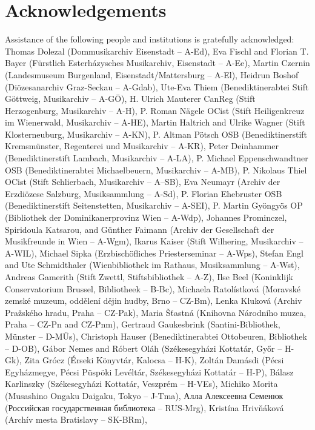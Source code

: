 \documentclass{ees}
\begin{document}
\section{Acknowledgements}

Assistance of the following people and institutions is gratefully acknowledged:
Thomas Dolezal (Dommusikarchiv Eisenstadt – A-Ed),
Eva Fischl and Florian T. Bayer (Fürstlich Esterházysches Musikarchiv, Eisenstadt – A-Ee),
Martin Czernin (Landesmuseum Burgenland, Eisenstadt/Mattersburg – A-El),
Heidrun Boshof (Diözesanarchiv Graz-Seckau – A-Gdab),
Ute-Eva Thiem (Benediktinerabtei Stift Göttweig, Musikarchiv – A-GÖ),
H. Ulrich Mauterer CanReg (Stift Herzogenburg, Musikarchiv – A-H),
P. Roman Nägele OCist (Stift Heiligenkreuz im Wienerwald, Musikarchiv – A-HE),
Martin Haltrich and Ulrike Wagner (Stift Klosterneuburg, Musikarchiv – A-KN),
P. Altman Pötsch OSB (Benediktinerstift Kremsmünster, Regenterei und Musikarchiv – A-KR),
Peter Deinhammer (Benediktinerstift Lambach, Musikarchiv – A-LA),
P. Michael Eppenschwandtner OSB (Benediktinerabtei Michaelbeuern, Musikarchiv – A-MB),
P. Nikolaus Thiel OCist (Stift Schlierbach, Musikarchiv – A–SB),
Eva Neumayr (Archiv der Erzdiözese Salzburg, Musiksammlung – A-Sd),
P. Florian Ehebruster OSB (Benediktinerstift Seitenstetten, Musikarchiv – A-SEI),
P. Martin Gyöngyös OP (Bibliothek der Dominikanerprovinz Wien – A-Wdp),
Johannes Prominczel, Spiridoula Katsarou, and Günther Faimann (Archiv der Gesellschaft der Musikfreunde in Wien – A-Wgm),
Ikarus Kaiser (Stift Wilhering, Musikarchiv – A-WIL),
Michael Sipka (Erzbischöfliches Priesterseminar – A-Wps),
Stefan Engl and Ute Schmidthaler (Wienbibliothek im Rathaus, Musiksammlung – A-Wst),
Andreas Gamerith (Stift Zwettl, Stiftsbibliothek – A-Z),
Ilse Beel (Koninklijk Conservatorium Brussel, Bibliotheek – B-Bc),
Michaela Ratolístková (Moravské zemské muzeum, oddělení dějin hudby, Brno  – CZ-Bm),
Lenka Kluková (Archiv Pražského hradu, Praha – CZ-Pak),
Maria Šťastná (Knihovna Národního muzea, Praha – CZ-Pn and CZ-Pnm),
Gertraud Gaukesbrink (Santini-Bibliothek, Münster – D-MÜs),
Christoph Hauser (Benediktinerabtei Ottobeuren, Bibliothek – D-OB),
Gábor Nemes and Róbert Oláh (Székesegyházi Kottatár, Győr – H-Gk),
Zita Grócz (Érseki Könyvtár, Kalocsa – H-K),
Zoltán Damásdi (Pécsi Egyházmegye, Pécsi Püspöki Levéltár, Székesegyházi Kottatár – H-P),
Bálasz Karlinszky (Székesegyházi Kottatár, Veszprém – H-VEs),
Michiko Morita (Musashino Ongaku Daigaku, Tokyo – J-Tma),
Алла Алексеевна Семенюк (Российская государственная библиотека – RUS-Mrg),
Kristína Hrivňáková (Archív mesta Bratislavy – SK-BRm),
\end{document}
